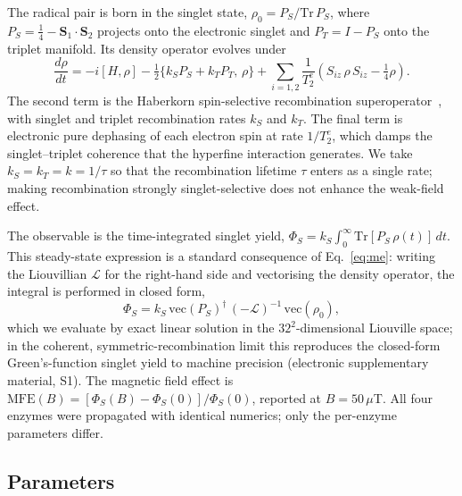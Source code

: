\documentclass[twoside,twocolumn,9pt]{article}
\begin{document}
The radical pair is born in the singlet state, $\rho_0 = P_S/\mathrm{Tr}\,P_S$,
where $P_S = \tfrac14 - \mathbf{S}_1\!\cdot\!\mathbf{S}_2$ projects onto the
electronic singlet and $P_T = I - P_S$ onto the triplet manifold. Its
density operator evolves under
\begin{equation}
\frac{d\rho}{dt} = -i[H,\rho]
  - \tfrac12\{k_S P_S + k_T P_T,\,\rho\}
  + \sum_{i=1,2}\frac{1}{T_2^e}\!\left(S_{iz}\,\rho\,S_{iz} - \tfrac14\rho\right).
\label{eq:me}
\end{equation}
The second term is the Haberkorn spin-selective recombination
superoperator~\cite{Haberkorn1976}, with singlet and triplet recombination rates
$k_S$ and $k_T$. The final term is electronic pure dephasing of each electron
spin at rate $1/T_2^e$, which damps the singlet--triplet coherence that the
hyperfine interaction generates. We take $k_S = k_T = k = 1/\tau$ so that the
recombination lifetime $\tau$ enters as a single rate; making recombination
strongly singlet-selective does not enhance the weak-field effect.

The observable is the time-integrated singlet yield,
$\Phi_S = k_S \int_0^{\infty}\!\mathrm{Tr}[P_S\,\rho(t)]\,dt$. This steady-state
expression is a standard consequence of Eq.~\eqref{eq:me}: writing the
Liouvillian $\mathcal{L}$ for the right-hand side and vectorising the density
operator, the integral is performed in closed form,
\begin{equation}
\Phi_S = k_S\, \mathrm{vec}(P_S)^{\dagger}\,(-\mathcal{L})^{-1}\,\mathrm{vec}(\rho_0),
\label{eq:yield}
\end{equation}
which we evaluate by exact linear solution in the $32^2$-dimensional Liouville
space; in the coherent, symmetric-recombination limit this reproduces the
closed-form Green's-function singlet yield to machine precision (electronic
supplementary material, S1). The magnetic field effect is
$\mathrm{MFE}(B) = [\Phi_S(B) - \Phi_S(0)]/\Phi_S(0)$, reported at
$B = 50\,\mu$T. All four enzymes were propagated with identical numerics; only
the per-enzyme parameters differ.

\subsection{Parameters}
\end{document}
